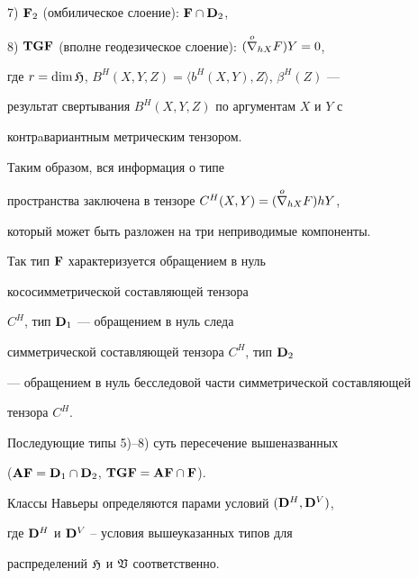 7) $\bold F_2$ (омбилическое слоение): $\bold F \cap \bold D_2$,





8) $ \bold {TGF}$ (вполне геодезическое слоение): $(\overset{o}{\nabla}{}_{hX}F)Y=0$,





\noindent{}где $r=\dim\frak H$, $B^H(X,Y,Z)=


\langle b^H(X, Y),Z\rangle$, $ \beta^H(Z)$ ---


результат свертывания $B^H(X,Y,Z)$ по аргументам $X$ и $Y$ с


контрaвариантным метрическим тензором.





\begin{note}


Таким образом, вся информация о типе


пространства заключена в тензоре $C^H(X,Y)=(\overset{o}{\nabla}{}_{hX}F)hY$,


который может быть разложен на три неприводимые компоненты.


Так тип $\bold F$ характеризуется обращением в нуль


кососимметрической составляющей тензора


$C^H$, тип $\bold D_1$ --- обращением в нуль следа


симметрической составляющей тензора $C^H$, тип $\bold D_2$


--- обращением в нуль бесследовой части симметрической составляющей


тензора $C^H$.


Последующие типы 5)--8) суть пересечение вышеназванных


($\bold {AF}=\bold D_1\cap \bold D_2$, $ \bold {TGF}=\bold {AF}


\cap \bold F$).


\end{note}





Классы Навьеры определяются парами условий $(\bold D^H, \bold


D^V)$,


где $\bold D^H$ и $\bold D^V$ -- условия вышеуказанных типов для


распределений $\frak H$ и $\frak V$ соответственно.


\medskip





